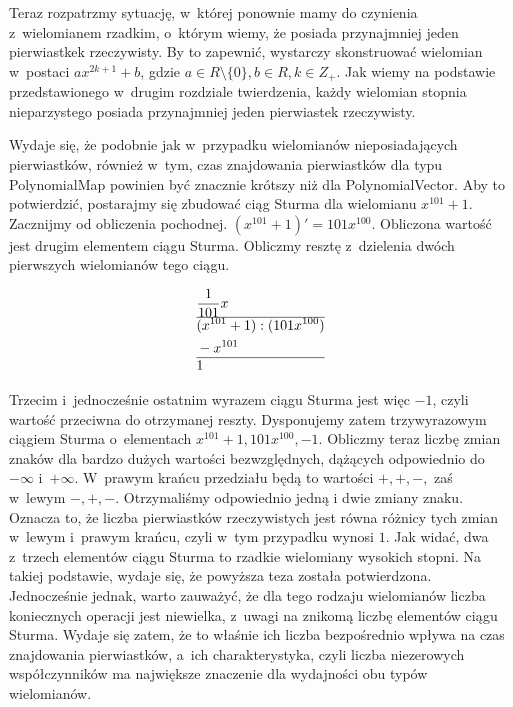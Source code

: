 Teraz rozpatrzmy sytuację, w~której ponownie mamy do czynienia z~wielomianem rzadkim, o~którym wiemy, że posiada przynajmniej jeden pierwiastkek rzeczywisty. By to zapewnić, wystarczy skonstruować wielomian w~postaci $ax^{2k+1}+b$, gdzie $a \in R\setminus\{0\}, b \in R, k \in Z_+$. Jak wiemy na podstawie przedstawionego w~drugim rozdziale twierdzenia, każdy wielomian stopnia nieparzystego posiada przynajmniej jeden pierwiastek rzeczywisty. 

Wydaje się, że podobnie jak w~przypadku wielomianów nieposiadających pierwiastków, również w~tym, czas znajdowania pierwiastków dla typu PolynomialMap powinien być znacznie krótszy niż dla PolynomialVector. Aby to potwierdzić, postarajmy się zbudować ciąg Sturma dla wielomianu $x^{101}+1$. Zacznijmy od obliczenia pochodnej. $(x^{101}+1)'=101x^{100}$. Obliczona wartość jest drugim elementem ciągu Sturma. Obliczmy resztę z~dzielenia dwóch pierwszych wielomianów tego ciągu.

\begin{equation*}
\begin{split}
&\frac{1}{101}x \\
\hline
&(x^{101}+1) : (101x^{100}) \\
&-x^{101} \\
\hline
&1
\end{split}
\end{equation*}

Trzecim i~jednocześnie ostatnim wyrazem ciągu Sturma jest więc $-1$, czyli wartość przeciwna do otrzymanej reszty. Dysponujemy zatem trzywyrazowym ciągiem Sturma o~elementach ${x^{101}+1, 101x^{100}, -1}$. Obliczmy teraz liczbę zmian znaków dla bardzo dużych wartości bezwzględnych, dążących odpowiednio do $-\infty$ i~$+\infty$. W~prawym krańcu przedziału będą to wartości $+,+,-,$ zaś w~lewym $-,+,-.$ Otrzymaliśmy odpowiednio jedną i dwie zmiany znaku. Oznacza to, że liczba pierwiastków rzeczywistych jest równa różnicy tych zmian w~lewym i~prawym krańcu, czyli w~tym przypadku wynosi $1$. Jak widać, dwa z~trzech elementów ciągu Sturma to rzadkie wielomiany wysokich stopni. Na takiej podstawie, wydaje się, że powyższa teza została potwierdzona. Jednocześnie jednak, warto zauważyć, że dla tego rodzaju wielomianów liczba koniecznych operacji jest niewielka, z~uwagi na znikomą liczbę elementów ciągu Sturma. Wydaje się zatem, że to właśnie ich liczba bezpośrednio wpływa na czas znajdowania pierwiastków, a~ich charakterystyka, czyli liczba niezerowych współczynników ma największe znaczenie dla wydajności obu typów wielomianów.

